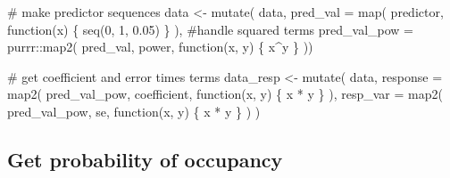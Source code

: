 \documentclass[
]{article}
\newenvironment{Shaded}{}{}
\newcommand{\CommentTok}[1]{\textcolor[rgb]{0.00,0.50,0.00}{#1}}
\newcommand{\ControlFlowTok}[1]{\textcolor[rgb]{0.00,0.00,1.00}{#1}}
\newcommand{\DataTypeTok}[1]{#1}
\newcommand{\DecValTok}[1]{#1}
\newcommand{\FloatTok}[1]{#1}
\newcommand{\KeywordTok}[1]{\textcolor[rgb]{0.00,0.00,1.00}{#1}}
\newcommand{\NormalTok}[1]{#1}
\newcommand{\OperatorTok}[1]{#1}
\newcommand{\StringTok}[1]{\textcolor[rgb]{0.00,0.50,0.50}{#1}}
\begin{document}
\begin{Shaded}
\begin{Highlighting}[]
\CommentTok{# make predictor sequences}
\NormalTok{data <-}\StringTok{ }\KeywordTok{mutate}\NormalTok{(}
\NormalTok{  data,}
  \DataTypeTok{pred_val =} \KeywordTok{map}\NormalTok{(}
\NormalTok{    predictor,}
    \ControlFlowTok{function}\NormalTok{(x) \{}
      \KeywordTok{seq}\NormalTok{(}\DecValTok{0}\NormalTok{, }\DecValTok{1}\NormalTok{, }\FloatTok{0.05}\NormalTok{)}
\NormalTok{    \}}
\NormalTok{  ),}
  \CommentTok{#handle squared terms}
  \DataTypeTok{pred_val_pow =}\NormalTok{ purrr}\OperatorTok{::}\KeywordTok{map2}\NormalTok{(}
\NormalTok{    pred_val, power,}
    \ControlFlowTok{function}\NormalTok{(x, y) \{}
\NormalTok{      x}\OperatorTok{^}\NormalTok{y}
\NormalTok{    \}}
\NormalTok{))}


\CommentTok{# get coefficient and error times terms}
\NormalTok{data_resp <-}\StringTok{ }\KeywordTok{mutate}\NormalTok{(}
\NormalTok{  data,}
  \DataTypeTok{response =} \KeywordTok{map2}\NormalTok{(}
\NormalTok{    pred_val_pow, coefficient,}
    \ControlFlowTok{function}\NormalTok{(x, y) \{}
\NormalTok{      x }\OperatorTok{*}\StringTok{ }\NormalTok{y}
\NormalTok{    \}}
\NormalTok{  ),}
  \DataTypeTok{resp_var =} \KeywordTok{map2}\NormalTok{(}
\NormalTok{    pred_val_pow, se,}
    \ControlFlowTok{function}\NormalTok{(x, y) \{}
\NormalTok{      x }\OperatorTok{*}\StringTok{ }\NormalTok{y}
\NormalTok{    \}}
\NormalTok{  )}
\NormalTok{)}
\end{Highlighting}
\end{Shaded}

\hypertarget{get-probability-of-occupancy}{%
\subsection{Get probability of occupancy}\label{get-probability-of-occupancy}}
\end{document}
